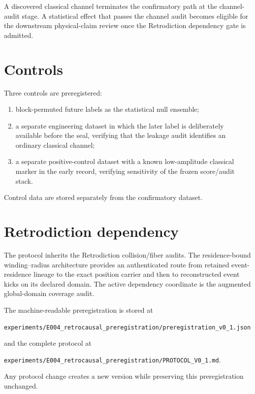 \documentclass[11pt]{book}
\begin{document}
A discovered classical channel terminates the confirmatory path at the channel-audit stage. A statistical effect that passes the channel audit becomes eligible for the downstream physical-claim review once the Retrodiction dependency gate is admitted.

\section{Controls}

Three controls are preregistered:

\begin{enumerate}
\item block-permuted future labels as the statistical null ensemble;
\item a separate engineering dataset in which the later label is deliberately available before the seal, verifying that the leakage audit identifies an ordinary classical channel;
\item a separate positive-control dataset with a known low-amplitude classical marker in the early record, verifying sensitivity of the frozen score/audit stack.
\end{enumerate}

Control data are stored separately from the confirmatory dataset.

\section{Retrodiction dependency}

The protocol inherits the Retrodiction collision/fiber audits. The residence-bound winding--radius architecture provides an authenticated route from retained event-residence lineage to the exact position carrier and then to reconstructed event kicks on its declared domain. The active dependency coordinate is the augmented global-domain coverage audit.

The machine-readable preregistration is stored at
\begin{center}
\texttt{experiments/E004\_retrocausal\_preregistration/preregistration\_v0\_1.json}
\end{center}
and the complete protocol at
\begin{center}
\texttt{experiments/E004\_retrocausal\_preregistration/PROTOCOL\_V0\_1.md}.
\end{center}

Any protocol change creates a new version while preserving this preregistration unchanged.
\end{document}
